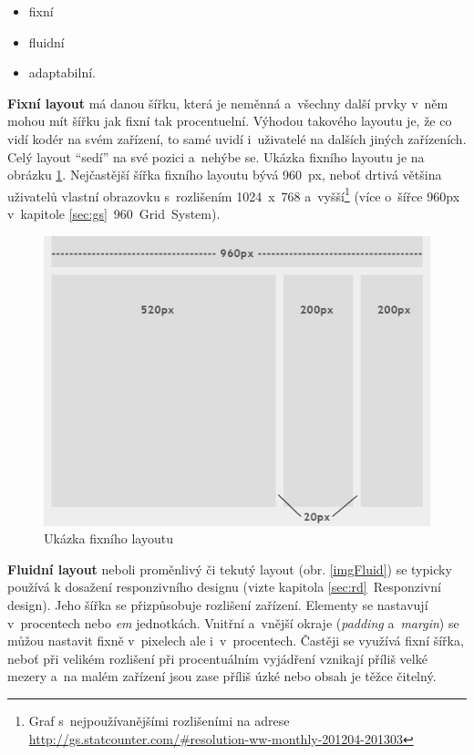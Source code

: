 \documentclass[thesis=B,czech]{FITthesis}[2012/06/26]
\begin{document}
\begin{itemize}
 \item fixní
 \item fluidní
 \item adaptabilní.
\end{itemize}
\textbf{Fixní layout} má danou šířku, která je neměnná a~všechny další prvky v~něm mohou mít šířku jak fixní tak procentuelní. Výhodou takového layoutu je, že co vidí kodér na svém zařízení, to samé uvidí i~uživatelé na dalších jiných zařízeních\cite{fix}. Celý layout “sedí” na své pozici a~nehýbe se. Ukázka fixního layoutu je na obrázku \ref{imgFix}. Nejčastější šířka fixního layoutu bývá 960~px, neboť drtivá většina uživatelů vlastní obrazovku s~rozlišením 1024~x~768 a~vyšší\footnote{Graf s~nejpoužívanějšími rozlišeními na adrese  \url{http://gs.statcounter.com/\#resolution-ww-monthly-201204-201303}} (více o~šířce 960px v~kapitole \ref{sec:gs}~960~Grid~System). 

\begin{figure}[h]
	\begin{center}
	\includegraphics[scale=0.5]{images/image06.png}
	\end{center}
	\caption{Ukázka fixního layoutu\cite{fix}}
	\label{imgFix}
\end{figure}


\textbf{Fluidní layout} neboli proměnlivý či tekutý layout (obr. \ref{imgFluid}) se typicky používá k dosažení responzivního designu (vizte kapitola \ref{sec:rd}~Responzivní design). Jeho šířka se přizpůsobuje rozlišení zařízení. Elementy se nastavují v~procentech nebo \textit{em} jednotkách. Vnitřní a~vnější okraje (\textit{padding} a~\textit{margin}) se můžou nastavit fixně v~pixelech ale i~v~procentech. Častěji se využívá fixní šířka, neboť při velikém rozlišení při procentuálním vyjádření vznikají příliš velké mezery a~na malém zařízení jsou zase příliš úzké nebo obsah je těžce čitelný\cite{fix}.
\end{document}
